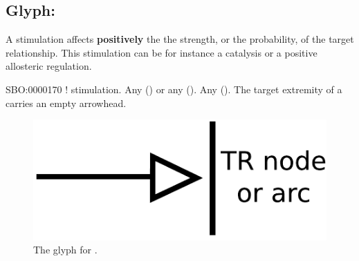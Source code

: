 
\subsection{Glyph: }\label{sec:stimulation}
\color{blue}

A stimulation affects \textbf{positively} the the strength, or the probability, of the target relationship. This stimulation can be for instance a catalysis or a positive allosteric regulation.

\begin{glyphDescription}
 \glyphSboTerm SBO:0000170 ! stimulation.
 \glyphOrigin Any  () or any  ().
 \glyphTarget Any  ().
 \glyphEndPoint The target extremity of a  carries an empty arrowhead.
 \end{glyphDescription}

\begin{figure}[H]
  \centering
  \includegraphics[scale = 0.5]{images/stimulation}
  \caption{The \PD glyph for .}
  \label{fig:stimulation}
\end{figure}



